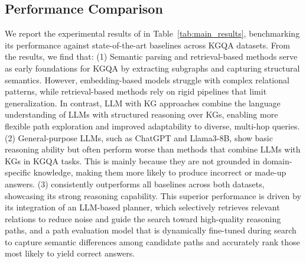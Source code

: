 \subsection{Performance Comparison}

We report the experimental results of \method{} in Table~\ref{tab:main_results}, benchmarking its performance against state-of-the-art baselines across KGQA datasets. From the results, we find that: 
(1) Semantic parsing and retrieval-based methods serve as early foundations for KGQA by extracting subgraphs and capturing structural semantics. However, embedding-based models struggle with complex relational patterns, while retrieval-based methods rely on rigid pipelines that limit generalization. In contrast, LLM with KG approaches combine the language understanding of LLMs with structured reasoning over KGs, enabling more flexible path exploration and improved adaptability to diverse, multi-hop queries.
(2) General-purpose LLMs, such as ChatGPT and Llama3-8B, show basic reasoning ability but often perform worse than methods that combine LLMs with KGs in KGQA tasks. This is mainly because they are not grounded in domain-specific knowledge, making them more likely to produce incorrect or made-up answers. 
(3) \method{} consistently outperforms all baselines across both datasets, showcasing its strong reasoning capability. This superior performance is driven by its integration of an LLM-based planner, which selectively retrieves relevant relations to reduce noise and guide the search toward high-quality reasoning paths, and a path evaluation model that is dynamically fine-tuned during search to capture semantic differences among candidate paths and accurately rank those most likely to yield correct answers.


